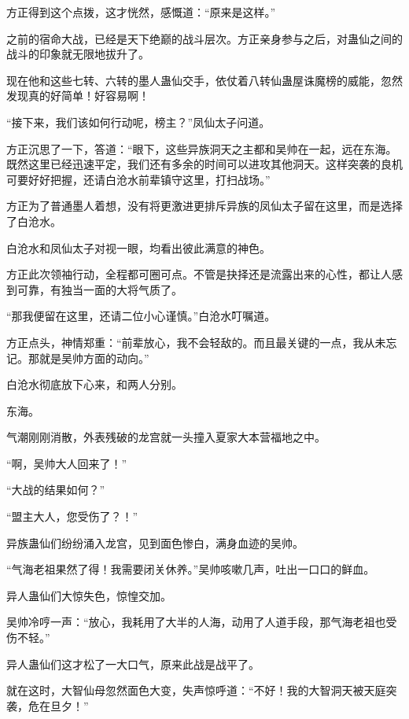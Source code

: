 \begin{this_body}
方正得到这个点拨，这才恍然，感慨道：“原来是这样。”

之前的宿命大战，已经是天下绝巅的战斗层次。方正亲身参与之后，对蛊仙之间的战斗的印象就无限地拔升了。

现在他和这些七转、六转的墨人蛊仙交手，依仗着八转仙蛊屋诛魔榜的威能，忽然发现真的好简单！好容易啊！

“接下来，我们该如何行动呢，榜主？”凤仙太子问道。

方正沉思了一下，答道：“眼下，这些异族洞天之主都和吴帅在一起，远在东海。既然这里已经迅速平定，我们还有多余的时间可以进攻其他洞天。这样突袭的良机可要好好把握，还请白沧水前辈镇守这里，打扫战场。”

方正为了普通墨人着想，没有将更激进更排斥异族的凤仙太子留在这里，而是选择了白沧水。

白沧水和凤仙太子对视一眼，均看出彼此满意的神色。

方正此次领袖行动，全程都可圈可点。不管是抉择还是流露出来的心性，都让人感到可靠，有独当一面的大将气质了。

“那我便留在这里，还请二位小心谨慎。”白沧水叮嘱道。

方正点头，神情郑重：“前辈放心，我不会轻敌的。而且最关键的一点，我从未忘记。那就是吴帅方面的动向。”

白沧水彻底放下心来，和两人分别。

东海。

气潮刚刚消散，外表残破的龙宫就一头撞入夏家大本营福地之中。

“啊，吴帅大人回来了！”

“大战的结果如何？”

“盟主大人，您受伤了？！”

异族蛊仙们纷纷涌入龙宫，见到面色惨白，满身血迹的吴帅。

“气海老祖果然了得！我需要闭关休养。”吴帅咳嗽几声，吐出一口口的鲜血。

异人蛊仙们大惊失色，惊惶交加。

吴帅冷哼一声：“放心，我耗用了大半的人海，动用了人道手段，那气海老祖也受伤不轻。”

异人蛊仙们这才松了一大口气，原来此战是战平了。

就在这时，大智仙母忽然面色大变，失声惊呼道：“不好！我的大智洞天被天庭突袭，危在旦夕！”

\end{this_body}

